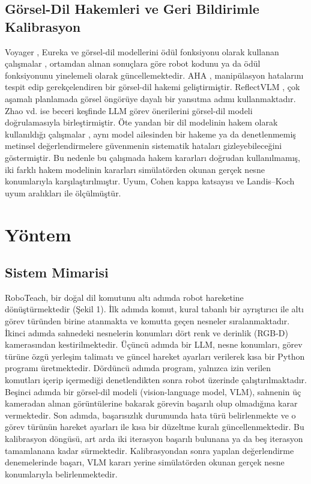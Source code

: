 \documentclass[preprint,12pt]{elsarticle}
\begin{document}
\hypertarget{guxf6rsel-dil-hakemleri-ve-geri-bildirimle-kalibrasyon}{%
\subsection{Görsel-Dil Hakemleri ve Geri Bildirimle Kalibrasyon}\label{guxf6rsel-dil-hakemleri-ve-geri-bildirimle-kalibrasyon}}

Voyager \cite{wang2024voyager}, Eureka \cite{ma2024eureka} ve görsel-dil modellerini ödül fonksiyonu olarak kullanan çalışmalar \cite{rocamonde2024vlmrm}, ortamdan alınan sonuçlara göre robot kodunu ya da ödül fonksiyonunu yinelemeli olarak güncellemektedir. AHA \cite{duan2025aha}, manipülasyon hatalarını tespit edip gerekçelendiren bir görsel-dil hakemi geliştirmiştir. ReflectVLM \cite{feng2025reflectvlm}, çok aşamalı planlamada görsel öngörüye dayalı bir yansıtma adımı kullanmaktadır. Zhao vd. \cite{zhao2026agentic} ise beceri keşfinde LLM görev önerilerini görsel-dil modeli doğrulamasıyla birleştirmiştir. Öte yandan bir dil modelinin hakem olarak kullanıldığı çalışmalar \cite{zheng2023judging}, aynı model ailesinden bir hakeme ya da denetlenmemiş metinsel değerlendirmelere güvenmenin sistematik hataları gizleyebileceğini göstermiştir. Bu nedenle bu çalışmada hakem kararları doğrudan kullanılmamış, iki farklı hakem modelinin kararları simülatörden okunan gerçek nesne konumlarıyla karşılaştırılmıştır. Uyum, Cohen kappa katsayısı \cite{cohen1960kappa} ve Landis--Koch uyum aralıkları \cite{landis1977kappa} ile ölçülmüştür.

\hypertarget{yuxf6ntem}{%
\section{Yöntem}\label{yuxf6ntem}}

\hypertarget{sistem-mimarisi}{%
\subsection{Sistem Mimarisi}\label{sistem-mimarisi}}

RoboTeach, bir doğal dil komutunu altı adımda robot hareketine dönüştürmektedir (Şekil 1). İlk adımda komut, kural tabanlı bir ayrıştırıcı ile altı görev türünden birine atanmakta ve komutta geçen nesneler sıralanmaktadır. İkinci adımda sahnedeki nesnelerin konumları dört renk ve derinlik (RGB-D) kamerasından kestirilmektedir. Üçüncü adımda bir LLM, nesne konumları, görev türüne özgü yerleşim talimatı ve güncel hareket ayarları verilerek kısa bir Python programı üretmektedir. Dördüncü adımda program, yalnızca izin verilen komutları içerip içermediği denetlendikten sonra robot üzerinde çalıştırılmaktadır. Beşinci adımda bir görsel-dil modeli (vision-language model, VLM), sahnenin üç kameradan alınan görüntülerine bakarak görevin başarılı olup olmadığına karar vermektedir. Son adımda, başarısızlık durumunda hata türü belirlenmekte ve o görev türünün hareket ayarları ile kısa bir düzeltme kuralı güncellenmektedir. Bu kalibrasyon döngüsü, art arda iki iterasyon başarılı bulunana ya da beş iterasyon tamamlanana kadar sürmektedir. Kalibrasyondan sonra yapılan değerlendirme denemelerinde başarı, VLM kararı yerine simülatörden okunan gerçek nesne konumlarıyla belirlenmektedir.
\end{document}
